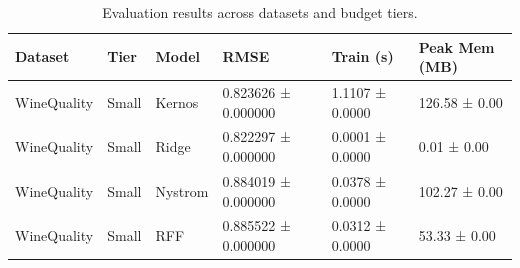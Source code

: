 \begin{table}[ht]
\centering
\small
\begin{tabular}{llllll}
\toprule
Dataset & Tier & Model & RMSE & Train (s) & Peak Mem (MB) \\
\midrule
WineQuality & Small & Kernos & 0.823626 ± 0.000000 & 1.1107 ± 0.0000 & 126.58 ± 0.00 \\
WineQuality & Small & Ridge & 0.822297 ± 0.000000 & 0.0001 ± 0.0000 & 0.01 ± 0.00 \\
WineQuality & Small & Nystrom & 0.884019 ± 0.000000 & 0.0378 ± 0.0000 & 102.27 ± 0.00 \\
WineQuality & Small & RFF & 0.885522 ± 0.000000 & 0.0312 ± 0.0000 & 53.33 ± 0.00 \\
\midrule
\bottomrule
\end{tabular}
\caption{Evaluation results across datasets and budget tiers.}
\end{table}